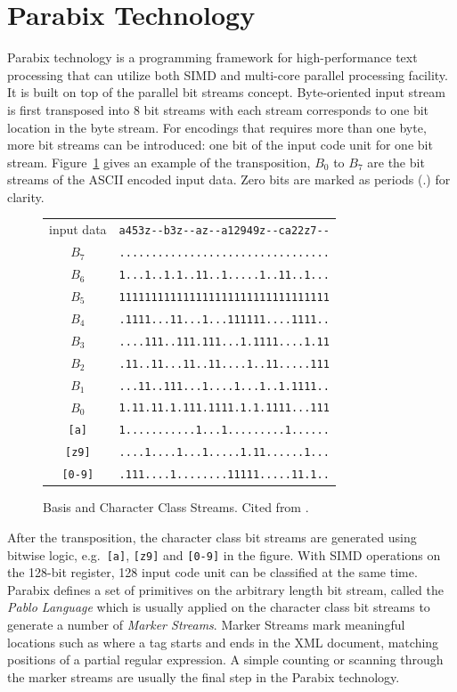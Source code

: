 \section{Parabix Technology}
Parabix technology is a programming framework for high-performance text processing that can utilize both SIMD and multi-core parallel processing facility. It is built on top of the parallel bit streams concept. Byte-oriented input stream is first transposed into 8 bit streams with each stream corresponds to one bit location in the byte stream. For encodings that requires more than one byte, more bit streams can be introduced: one bit of the input code unit for one bit stream. Figure~\ref{figure:streams} gives an example of the transposition, $B_0$ to $B_7$ are the bit streams of the ASCII encoded input data. Zero bits are marked as periods (.) for clarity.

\begin{figure}[tbh]
\begin{center}
\begin{tabular}{cr}\\
input data  & \verb`a453z--b3z--az--a12949z--ca22z7--`\\
$B_7$ & \verb`.................................`\\
$B_6$ & \verb`1...1..1.1..11..1.....1..11..1...`\\
$B_5$ & \verb`111111111111111111111111111111111`\\
$B_4$ & \verb`.1111...11...1...111111....1111..`\\
$B_3$ & \verb`....111..111.111...1.1111....1.11`\\
$B_2$ & \verb`.11..11...11..11....1..11.....111`\\
$B_1$ & \verb`...11..111...1....1...1..1.1111..`\\
$B_0$ & \verb`1.11.11.1.111.1111.1.1.1111...111`\\
\verb:[a]: & \verb`1...........1...1.........1......`\\
\verb:[z9]: & \verb`....1....1...1.....1.11......1...`\\
\verb:[0-9]: & \verb`.111....1........11111.....11.1..`
\end{tabular}
\end{center}
\caption[Basis and Character Class Streams]{Basis and Character Class Streams. Cited from \cite{rob_regex}.}
\label{figure:streams}
\end{figure}

After the transposition, the character class bit streams are generated using bitwise logic, e.g.\ \verb:[a]:, \verb:[z9]: and \verb:[0-9]: in the figure. With SIMD operations on the 128-bit register, 128 input code unit can be classified at the same time. Parabix defines a set of primitives on the arbitrary length bit stream, called the \textit{Pablo Language} which is usually applied on the character class bit streams to generate a number of \textit{Marker Streams}. Marker Streams mark meaningful locations such as where a tag starts and ends in the XML document, matching positions of a partial regular expression. A simple counting or scanning through the marker streams are usually the final step in the Parabix technology.


